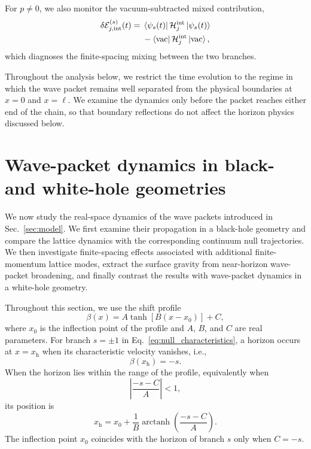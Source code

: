 \documentclass[reprint,amsmath,amssymb,aps,prb,showkeys,superscriptaddress]{revtex4-2}
\begin{document}
For $p\neq0$, we also monitor the vacuum-subtracted mixed
contribution,
\begin{equation}
\begin{aligned}
  \delta\mathcal{E}_{j,\mathrm{int}}^{(s)}(t)
  ={}&
  \bra{\psi_s(t)}
  \mathcal{H}_j^{\mathrm{int}}
  \ket{\psi_s(t)}
  \\
  &-
  \bra{\mathrm{vac}}
  \mathcal{H}_j^{\mathrm{int}}
  \ket{\mathrm{vac}},
\end{aligned}
  \label{eq:mixed_energy}
\end{equation}
which diagnoses the finite-spacing mixing between the two branches.

Throughout the analysis below, we restrict the time evolution to
the regime in which the wave packet remains well separated from the
physical boundaries at $x=0$ and $x=\ell$. We examine the dynamics
only before the packet reaches either end of the chain, so that
boundary reflections do not affect the horizon physics discussed
below.

\section{Wave-packet dynamics in black- and white-hole geometries}
\label{sec:dynamics}

We now study the real-space dynamics of the wave packets introduced
in Sec.~\ref{sec:model}. We first examine their propagation in a
black-hole geometry and compare the lattice dynamics with the
corresponding continuum null trajectories. We then investigate
finite-spacing effects associated with additional finite-momentum
lattice modes, extract the surface gravity from near-horizon
wave-packet broadening, and finally contrast the results with
wave-packet dynamics in a white-hole geometry.

Throughout this section, we use the shift profile
\begin{equation}
  \beta(x)
  =
  A\tanh\left[B(x-x_0)\right]+C,
  \label{eq:beta_profile}
\end{equation}
where $x_0$ is the inflection point of the profile and $A$, $B$,
and $C$ are real parameters. For branch $s=\pm1$ in
Eq.~\eqref{eq:null_characteristics}, a horizon occurs at
$x=x_{\mathrm h}$ when its characteristic velocity vanishes, i.e.,
\begin{equation}
  \beta(x_{\mathrm h})=-s.
  \label{eq:general_horizon_condition}
\end{equation}
When the horizon lies within the range of the profile, equivalently
when
\begin{equation}
  \left|
    \frac{-s-C}{A}
  \right|
  <1,
\end{equation}
its position is
\begin{equation}
  x_{\mathrm h}
  =
  x_0
  +
  \frac{1}{B}
  \operatorname{arctanh}
  \left(
    \frac{-s-C}{A}
  \right).
  \label{eq:horizon_position}
\end{equation}
The inflection point $x_0$ coincides with the horizon of branch $s$
only when $C=-s$.
\end{document}

